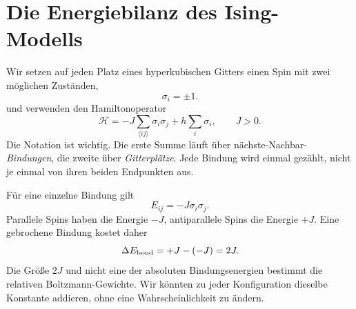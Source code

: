 \section{Die Energiebilanz des Ising-Modells}

Wir setzen auf jeden Platz eines hyperkubischen Gitters einen Spin mit zwei möglichen Zuständen,
\begin{equation}
\sigma_i=\pm1.
\end{equation}
und verwenden den Hamiltonoperator
\begin{equation}
\mathcal H
=-J\sum_{\langle ij\rangle}\sigma_i\sigma_j
+h\sum_i\sigma_i,
\qquad J>0.
\label{eq:ising-hamiltonian}
\end{equation}
Die Notation ist wichtig. Die erste Summe läuft über nächste-Nachbar-\emph{Bindungen}, die zweite über \emph{Gitterplätze}. Jede Bindung wird einmal gezählt, nicht je einmal von ihren beiden Endpunkten aus.

Für eine einzelne Bindung gilt
\begin{equation}
E_{ij}=-J\sigma_i\sigma_j.
\end{equation}
Parallele Spins haben die Energie \(-J\), antiparallele Spins die Energie \(+J\). Eine gebrochene Bindung kostet daher
\begin{equation}
\Delta E_{\rm bond}=+J-(-J)=2J.
\label{eq:broken-bond}
\end{equation}
Die Größe \(2J\) und nicht eine der absoluten Bindungsenergien bestimmt die relativen Boltzmann-Gewichte. Wir könnten zu jeder Konfiguration dieselbe Konstante addieren, ohne eine Wahrscheinlichkeit zu ändern.

\begin{classroomqa}
\end{classroomqa}

\begin{classroomqa}
\end{classroomqa}

